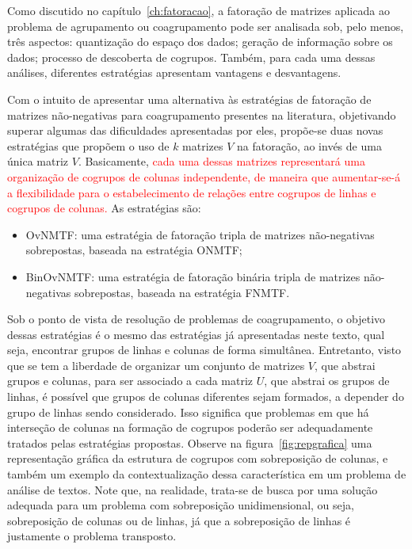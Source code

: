 \documentclass[
    12pt,                %
    oneside,            %
    a4paper,            %
    english,            %
    brazil                %
    ]{abntex2ppgsi}
\begin{document}


Como discutido no capítulo~\ref{ch:fatoracao}, a fatoração de matrizes aplicada ao problema de agrupamento ou coagrupamento pode ser analisada sob, pelo menos, três aspectos: quantização do espaço dos dados; geração de informação sobre os dados; processo de descoberta de cogrupos. Também, para cada uma dessas análises, diferentes estratégias apresentam vantagens e desvantagens.

Com o intuito de apresentar uma alternativa às estratégias de fatoração de matrizes não-negativas para coagrupamento presentes na literatura, objetivando superar algumas das dificuldades apresentadas por eles, propõe-se duas novas estratégias que propõem o uso de $k$ matrizes $V$ na fatoração, ao invés de uma única matriz $V$. Basicamente, \textcolor{red}{cada uma dessas matrizes representará uma organização de cogrupos de colunas independente, de maneira que aumentar-se-á a flexibilidade para o estabelecimento de relações entre cogrupos de linhas e cogrupos de colunas.} As estratégias são:

\begin{itemize}
\item OvNMTF: uma estratégia de fatoração tripla de matrizes não-negativas sobrepostas, baseada na estratégia ONMTF;
\item BinOvNMTF: uma estratégia de fatoração binária tripla de matrizes não-negativas sobrepostas, baseada na estratégia FNMTF.
\end{itemize}

Sob o ponto de vista de resolução de problemas de coagrupamento, o objetivo dessas estratégias é o mesmo das estratégias já apresentadas neste texto, qual seja, encontrar grupos de linhas e colunas de forma simultânea. Entretanto, visto que se tem a liberdade de organizar um conjunto de matrizes $V$, que abstrai grupos e colunas, para ser associado a cada matriz $U$, que abstrai os grupos de linhas, é possível que grupos de colunas diferentes sejam formados, a depender do grupo de linhas sendo considerado. Isso significa que problemas em que há interseção de colunas na formação de cogrupos poderão ser adequadamente tratados pelas estratégias propostas. Observe na figura~\ref{fig:repgrafica} uma representação gráfica da estrutura de cogrupos com sobreposição de colunas, e também um exemplo da contextualização dessa característica em um problema de análise de textos. Note que, na realidade, trata-se de busca por uma solução adequada para um problema com sobreposição unidimensional, ou seja, sobreposição de colunas ou de linhas, já que a sobreposição de linhas é justamente o problema transposto.
\end{document}
